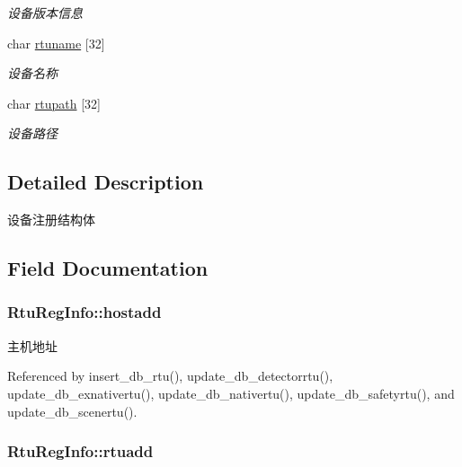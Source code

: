 \begin{DoxyCompactItemize}
\begin{DoxyCompactList}\small\item\em 设备版本信息 \end{DoxyCompactList}\item 
char \hyperlink{structRtuRegInfo_a390a2ef91f80d812946dfafea26b23a1}{rtuname} \mbox{[}32\mbox{]}
\begin{DoxyCompactList}\small\item\em 设备名称 \end{DoxyCompactList}\item 
char \hyperlink{structRtuRegInfo_a1e566f9bc82c3366aec587cbf618899c}{rtupath} \mbox{[}32\mbox{]}
\begin{DoxyCompactList}\small\item\em 设备路径 \end{DoxyCompactList}\end{DoxyCompactItemize}


\subsection{Detailed Description}
设备注册结构体 

\subsection{Field Documentation}
\hypertarget{structRtuRegInfo_a3a9169b06ae6cdef4716b9ce96e2effb}{
\subsubsection[{hostadd}]{ Rtu\-Reg\-Info\-::hostadd}}\label{structRtuRegInfo_a3a9169b06ae6cdef4716b9ce96e2effb}


主机地址 



Referenced by insert\-\_\-db\-\_\-rtu(), update\-\_\-db\-\_\-detectorrtu(), update\-\_\-db\-\_\-exnativertu(), update\-\_\-db\-\_\-nativertu(), update\-\_\-db\-\_\-safetyrtu(), and update\-\_\-db\-\_\-scenertu().

\hypertarget{structRtuRegInfo_a11bec18706037da6d0d8893a3f6ecc8c}{
\subsubsection[{rtuadd}]{ Rtu\-Reg\-Info\-::rtuadd}}\label{structRtuRegInfo_a11bec18706037da6d0d8893a3f6ecc8c}


